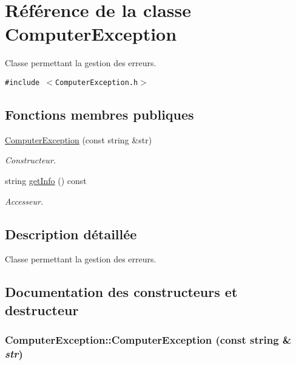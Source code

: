 \hypertarget{class_computer_exception}{
\section{Référence de la classe ComputerException}
\label{class_computer_exception}
}
Classe permettant la gestion des erreurs.  


{\tt \#include $<$ComputerException.h$>$}

\subsection*{Fonctions membres publiques}
\begin{CompactItemize}
\item 
\hyperlink{class_computer_exception_99e174aa8c506b2f4d9bc3dc7846cc8a}{ComputerException} (const string \&str)
\begin{CompactList}\small\item\em Constructeur. \item\end{CompactList}\item 
string \hyperlink{class_computer_exception_a4c5726f929576598b204e162b6912fa}{getInfo} () const 
\begin{CompactList}\small\item\em Accesseur. \item\end{CompactList}\end{CompactItemize}


\subsection{Description détaillée}
Classe permettant la gestion des erreurs. 

\subsection{Documentation des constructeurs et destructeur}
\hypertarget{class_computer_exception_99e174aa8c506b2f4d9bc3dc7846cc8a}{
\subsubsection[{ComputerException}]{\setlength{\rightskip}{0pt plus 5cm}ComputerException::ComputerException (const string \& {\em str})}}
\label{class_computer_exception_99e174aa8c506b2f4d9bc3dc7846cc8a}


